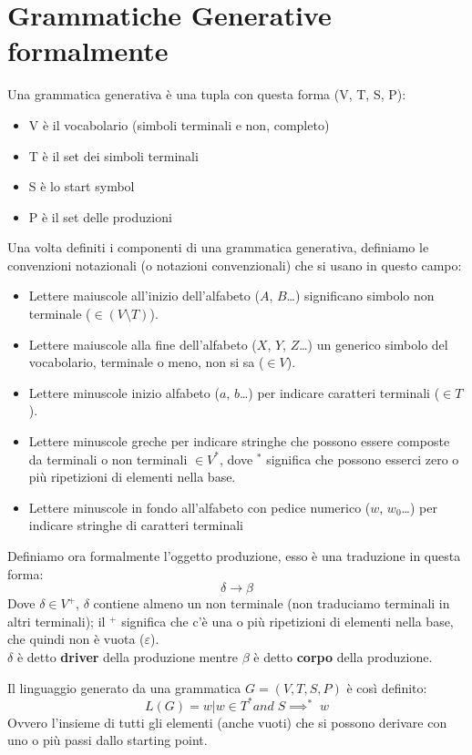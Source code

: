 \documentclass[class=book, crop=false, oneside, 12pt]{standalone}
\begin{document}
\section{Grammatiche Generative formalmente}
Una grammatica generativa è una tupla con questa forma (V, T, S, P):
\begin{itemize}
    \item V è il vocabolario (simboli terminali e non, completo)
    \item T è il set dei simboli terminali
    \item S è lo start symbol
    \item P è il set delle produzioni
\end{itemize}
Una volta definiti i componenti di una grammatica generativa, definiamo le convenzioni notazionali (o notazioni convenzionali) che si usano in questo campo:
\begin{itemize}
    \item Lettere maiuscole all’inizio dell’alfabeto ($A$, $B$…) significano simbolo non terminale ($\in (V \setminus T)$).
    \item Lettere maiuscole alla fine dell’alfabeto ($X$, $Y$, $Z$…) un generico simbolo del vocabolario, terminale o meno, non si sa ($\in V$).
    \item Lettere minuscole inizio alfabeto ($a$, $b$…) per indicare caratteri terminali ($\in T$).
    \item Lettere minuscole greche per indicare stringhe che possono essere composte da terminali o non terminali $\in V^*$, dove $^*$ significa che possono esserci zero o più ripetizioni di elementi nella base.
    \item Lettere minuscole in fondo all’alfabeto con pedice numerico ($w$, $w_0$…) per indicare stringhe di caratteri terminali
\end{itemize}
Definiamo ora formalmente l'oggetto produzione, esso è una traduzione in questa forma:
\begin{equation}
    \delta \to \beta
\end{equation}
Dove $\delta \in V^+$, $\delta$ contiene almeno un non terminale (non traduciamo terminali in altri terminali); il $^+$ significa che c’è una o più ripetizioni di elementi nella base, che quindi non è vuota ($\varepsilon$).\\
$\delta$ è detto \textbf{driver} della produzione mentre $\beta$ è detto \textbf{corpo} della produzione.

Il linguaggio generato da una grammatica $G = (V,T,S,P)$ è così definito:
\begin{equation}
    L(G) = {w | w \in T^* and \; S \implies^* \; w }
\end{equation}
Ovvero l'insieme di tutti gli elementi (anche vuoti) che si possono derivare con uno o più passi dallo starting point.
\end{document}

